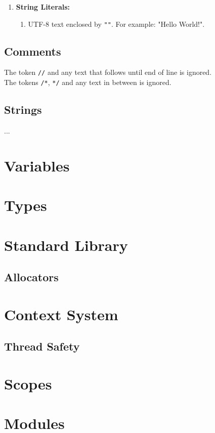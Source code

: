 \documentclass[leqno,12pt]{article}
\begin{document}
\begin{enumerate}
\begin{enumerate}
            \item
            \textbf{String Literals:}
            \begin{enumerate}[label=(\roman*)]
                \item
                UTF-8 text enclosed by \texttt{""}. For example: "Hello World!".
            \end{enumerate}

        \end{enumerate}
    \end{enumerate}

    \subsection{Comments}
    \label{comments_section}
    The token \texttt{//} and any text that follows until end of line is ignored.\\
    The tokens \texttt{/*}, \texttt{*/} and any text in between is ignored.

    \subsection{Strings}
    \label{strings_section}
    ...

    \section{Variables}

    \section{Types}

    \section{Standard Library}
    \subsection{Allocators}

    \section{Context System}
    \subsection{Thread Safety}

    \section{Scopes}

    \section{Modules}
\end{document}
